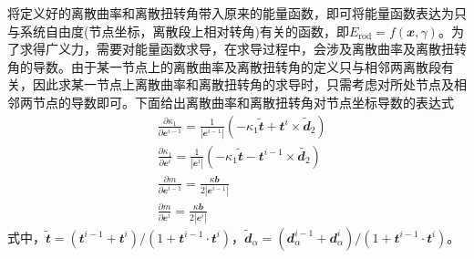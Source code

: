 将定义好的离散曲率和离散扭转角带入原来的能量函数，即可将能量函数表达为只与系统自由度(节点坐标，离散段上相对转角)有关的函数，即$E_\mathrm{rod}=f(\mathbfit{x},\gamma)$。为了求得广义力，需要对能量函数求导，在求导过程中，会涉及离散曲率及离散扭转角的导数。由于某一节点上的离散曲率及离散扭转角的定义只与相邻两离散段有关，因此求某一节点上离散曲率和离散扭转角的求导时，只需考虑对所处节点及相邻两节点的导数即可。下面给出离散曲率和离散扭转角对节点坐标导数的表达式\cite{bergou2010discrete}
\begin{equation}
	\begin{split}
		&\frac{\partial \kappa_{1}}{\partial \mathbfit{e}^{i-1}}  =\frac{1}{\left|\mathbfit{e}^{i-1}\right|}\left(-\kappa_{1} \tilde{\mathbfit{t}}+\mathbfit{t}^{i} \times \tilde{\mathbfit{d}}_{2}\right) \\
	    &\frac{\partial \kappa_{1}}{\partial \mathbfit{e}^{i}}  =\frac{1}{\left|\mathbfit{e}^{i}\right|}\left(-\kappa_{1} \tilde{\mathbfit{t}}-\mathbfit{t}^{i-1} \times \tilde{\mathbfit{d}_{2}}\right) \\
		&\frac{\partial m}{\partial \mathbfit{e}^{i-1}}=\frac{\kappa \mathbfit{b}}{2\left|\mathbfit{e}^{i-1}\right|} \\
		&\frac{\partial m}{\partial \mathbfit{e}^{i}}=\frac{\kappa \mathbfit{b}}{2\left|\mathbfit{e}^{i}\right|}
	\end{split}
\end{equation}
式中，$\tilde{\mathbfit{t}}=(\mathbfit{t}^{i-1}+\mathbfit{t}^{i})/(1+\mathbfit{t}^{i-1}\cdot \mathbfit{t}^{i})$，$\tilde{\mathbfit{d}}_{\alpha}=(\mathbfit{d}_{\alpha}^{i-1}+\mathbfit{d}_{\alpha}^{i})/(1+\mathbfit{t}^{i-1}\cdot \mathbfit{t}^{i})$。
